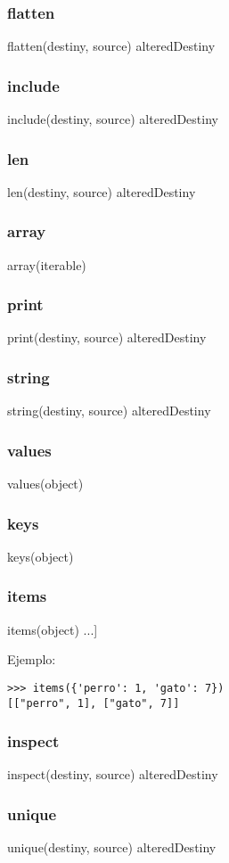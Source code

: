 \subsubsection*{flatten}
flatten(destiny, source) \rightarrow alteredDestiny
\subsubsection*{include}
include(destiny, source) \rightarrow alteredDestiny
\subsubsection*{len}
len(destiny, source) \rightarrow alteredDestiny
\subsubsection*{array}
array(iterable) \rightarrow [element...]
\subsubsection*{print}
print(destiny, source) \rightarrow alteredDestiny
\subsubsection*{string}
string(destiny, source) \rightarrow alteredDestiny
\subsubsection*{values}
values(object) \rightarrow [value...]
\subsubsection*{keys}
keys(object) \rightarrow [key...]
\subsubsection*{items}
items(object) \rightarrow [[key, value]...]

\noindent
Ejemplo:
\begin{lstlisting}[style=consola]
>>> items({'perro': 1, 'gato': 7})
[["perro", 1], ["gato", 7]]
\end{lstlisting}
\subsubsection*{inspect}
inspect(destiny, source) \rightarrow alteredDestiny
\subsubsection*{unique}
unique(destiny, source) \rightarrow alteredDestiny
